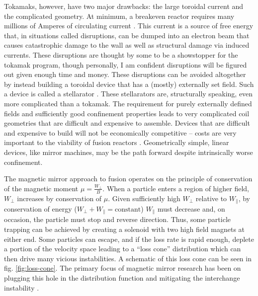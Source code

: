 Tokamaks, however, have two major drawbacks: the large toroidal current and the complicated geometry. At minimum, a breakeven reactor requires many millions of Amperes of circulating current \cite{creely_overview_2020}. This current is a source of free energy that, in situations called disruptions, can be dumped into an electron beam that causes catastrophic damage to the wall as well as structural damage via induced currents. These disruptions are thought by some to be a showstopper for the tokamak program, though personally, I am confident disruptions will be figured out given enough time and money. These disruptions can be avoided altogether by instead building a toroidal device that has a (mostly) externally set field. Such a device is called a stellarator \cite{boozer_what_1998}. These stellarators are, structurally speaking, even more complicated than a tokamak. The requirement for purely externally defined fields and sufficiently good confinement properties leads to very complicated coil geometries that are difficult and expensive to assemble. Devices that are difficult and expensive to build will not be economically competitive -- costs are very important to the viability of fusion reactors \cite{schwartz_value_2023}. Geometrically simple, linear devices, like mirror machines, may be the path forward despite intrinsically worse confinement. 

The magnetic mirror approach to fusion \cite{Post_1987} operates on the principle of conservation of the magnetic moment $\mu = \frac{W_\perp}{B}$. When a particle enters a region of higher field, $W_\perp$ increases by conservation of $\mu$. Given sufficiently high $W_\perp$ relative to $W_\parallel$, by conservation of energy ($W_\perp + W_\parallel = \text{constant}$) $W_\parallel$ must decrease and, on occasion, the particle must stop and reverse direction. Thus, some particle trapping can be achieved by creating a solenoid with two high field magnets at either end. Some particles can escape, and if the loss rate is rapid enough, deplete a portion of the velocity space leading to a ``loss cone'' distribution which can then drive many vicious instabilities. A schematic of this loss cone can be seen in fig. \ref{fig:loss-cone}. The primary focus of magnetic mirror research has been on plugging this hole in the distribution function and mitigating the interchange instability \cite{Post_1987}.

